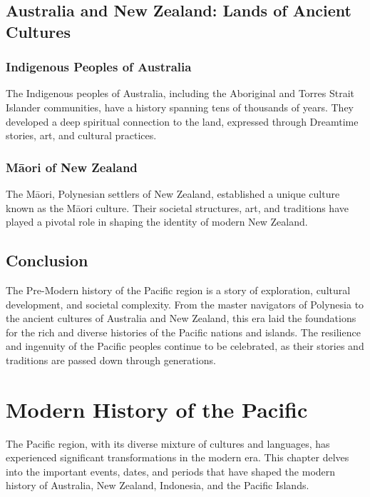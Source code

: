\documentclass[a4paper,12pt]{book}
\begin{document}
\section{Australia and New Zealand: Lands of Ancient Cultures}
\label{sec:australia-new-zealand}

\subsection{Indigenous Peoples of Australia}
\label{subsec:australia-indigenous-peoples}

The Indigenous peoples of Australia, including the Aboriginal and Torres Strait Islander communities, have a history spanning tens of thousands of years. They developed a deep spiritual connection to the land, expressed through Dreamtime stories, art, and cultural practices.

\subsection{Māori of New Zealand}
\label{subsec:maori-new-zealand}

The Māori, Polynesian settlers of New Zealand, established a unique culture known as the Māori culture. Their societal structures, art, and traditions have played a pivotal role in shaping the identity of modern New Zealand.

\section{Conclusion}
\label{sec:conclusion-pre-modern-pacific}

The Pre-Modern history of the Pacific region is a story of exploration, cultural development, and societal complexity. From the master navigators of Polynesia to the ancient cultures of Australia and New Zealand, this era laid the foundations for the rich and diverse histories of the Pacific nations and islands. The resilience and ingenuity of the Pacific peoples continue to be celebrated, as their stories and traditions are passed down through generations.

\chapter{Modern History of the Pacific}
\label{ch:modern-pacific-history}

The Pacific region, with its diverse mixture of cultures and languages, has experienced significant transformations in the modern era. This chapter delves into the important events, dates, and periods that have shaped the modern history of Australia, New Zealand, Indonesia, and the Pacific Islands.
\end{document}
